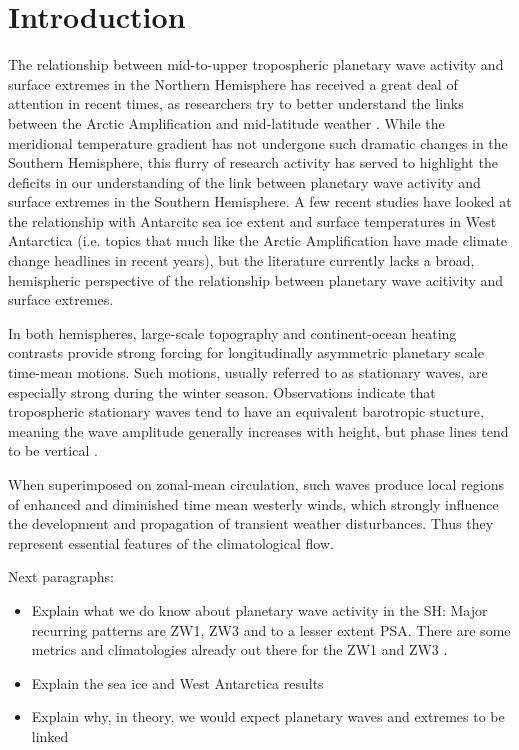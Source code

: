 \section{Introduction}\label{s:introduction}

The relationship between mid-to-upper tropospheric planetary wave activity and surface extremes in the Northern Hemisphere has received a great deal of attention in recent times, as researchers try to better understand the links between the Arctic Amplification and mid-latitude weather \citep[e.g.][]{Cohen2014,Screen2014}. While the meridional temperature gradient has not undergone such dramatic changes in the Southern Hemisphere, this flurry of research activity has served to highlight the deficits in our understanding of the link between planetary wave activity and surface extremes in the Southern Hemisphere. A few recent studies have looked at the relationship with Antarcitc sea ice extent \citep{Raphael2007,Raphael2014} and surface temperatures in West Antarctica \citep{Ding2011,Ding2013} (i.e. topics that much like the Arctic Amplification have made climate change headlines in recent years), but the literature currently lacks a broad, hemispheric perspective of the relationship between planetary wave acitivity and surface extremes. 

In both hemispheres, large-scale topography and continent-ocean heating contrasts provide strong forcing for longitudinally asymmetric planetary scale time-mean motions. Such motions, usually referred to as stationary waves, are especially strong during the winter season. Observations indicate that tropospheric stationary waves tend to have an equivalent barotropic stucture, meaning the wave amplitude generally increases with height, but phase lines tend to be vertical \citep{Holten2013}. 



When superimposed on zonal-mean circulation, such waves produce local regions of enhanced and diminished time mean westerly winds, which strongly influence the development and propagation of transient weather disturbances. Thus they represent essential features of the climatological flow.

Next paragraphs:
\begin{itemize}
\item Explain what we do know about planetary wave activity in the SH: Major recurring patterns are ZW1, ZW3 and to a lesser extent PSA. There are some metrics and climatologies already out there for the ZW1 and ZW3 \citep{Raphael2004,Hobbs2007}.
\item Explain the sea ice and West Antarctica results
\item Explain why, in theory, we would expect planetary waves and extremes to be linked
\end{itemize}

